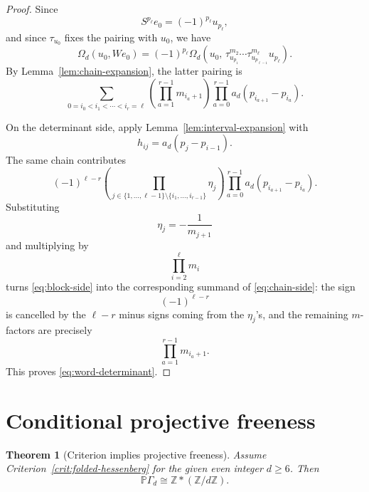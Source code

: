 \documentclass[a4paper,11pt]{amsart}
\newcommand{\Z}{\mathbb Z}
\newcommand{\Pj}{\mathbb P}
\newtheorem{theorem}{Theorem}[section]
\theoremstyle{remark}
\numberwithin{equation}{section}
\begin{document}
\begin{proof}
Since
\[
S^{p_\ell}e_0=(-1)^{p_\ell}u_{p_\ell},
\]
and since \(\tau_{u_0}\) fixes the pairing with \(u_0\), we have
\[
\Omega_d(u_0,We_0)
=
(-1)^{p_\ell}
\Omega_d\left(
u_0,\,
\tau_{u_{p_1}}^{m_2}
\cdots
\tau_{u_{p_{\ell-1}}}^{m_\ell}
u_{p_\ell}
\right).
\]
By Lemma~\ref{lem:chain-expansion}, the latter pairing is
\begin{equation}\label{eq:chain-side}
\sum_{0=i_0<i_1<\cdots<i_r=\ell}
\left(
\prod_{a=1}^{r-1}m_{i_a+1}
\right)
\prod_{a=0}^{r-1}
a_d(p_{i_{a+1}}-p_{i_a}).
\end{equation}

On the determinant side, apply Lemma~\ref{lem:interval-expansion} with
\[
h_{ij}=a_d(p_j-p_{i-1}).
\]
The same chain contributes
\begin{equation}\label{eq:block-side}
(-1)^{\ell-r}
\left(
\prod_{j\in\{1,\ldots,\ell-1\}\setminus\{i_1,\ldots,i_{r-1}\}}\eta_j
\right)
\prod_{a=0}^{r-1}
a_d(p_{i_{a+1}}-p_{i_a}).
\end{equation}
Substituting
\[
\eta_j=-\frac1{m_{j+1}}
\]
and multiplying by
\[
\prod_{i=2}^{\ell}m_i
\]
turns \eqref{eq:block-side} into the corresponding summand of \eqref{eq:chain-side}: the sign
\[
(-1)^{\ell-r}
\]
is cancelled by the \(\ell-r\) minus signs coming from the \(\eta_j\)'s, and the remaining \(m\)-factors are precisely
\[
\prod_{a=1}^{r-1}m_{i_a+1}.
\]
This proves \eqref{eq:word-determinant}.
\end{proof}

\section{Conditional projective freeness}

\begin{theorem}[Criterion implies projective freeness]\label{thm:criterion-free}
Assume Criterion~\ref{crit:folded-hessenberg} for the given even integer \(d\geq6\). Then
\begin{equation}\label{eq:projective-free-product}
\Pj\Gamma_d\cong \Z*(\Z/d\Z).
\end{equation}
\end{theorem}
\end{document}
